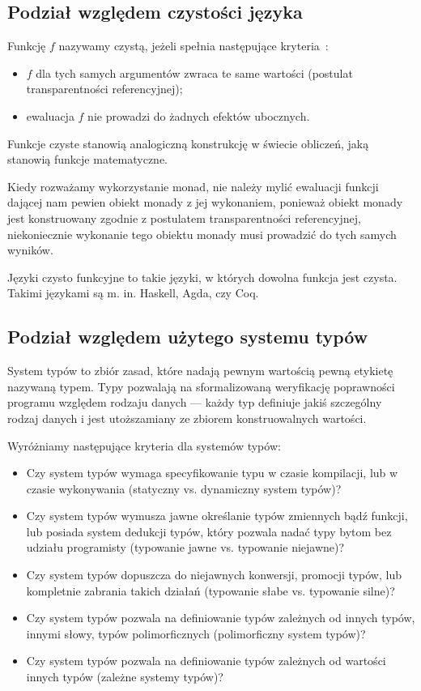 \documentclass[../praca.tex]{subfiles}
\begin{document}
\subsection{Podział względem czystości języka}

Funkcję \( f \) nazywamy czystą, jeżeli spełnia następujące kryteria~\cite{Milewski:PF}:
\begin{itemize}
  \item \( f \) dla tych samych argumentów zwraca te same wartości
    (postulat transparentności referencyjnej);
  \item ewaluacja \( f \) nie prowadzi do żadnych efektów ubocznych.
\end{itemize}

Funkcje czyste stanowią analogiczną konstrukcję w świecie obliczeń, jaką stanowią
funkcje matematyczne.

\begin{remark}
  Kiedy rozważamy wykorzystanie monad, nie należy mylić ewaluacji funkcji
  dającej nam pewien obiekt monady z jej wykonaniem, ponieważ
  obiekt monady jest konstruowany zgodnie z postulatem transparentności referencyjnej,
  niekoniecznie wykonanie tego obiektu monady musi prowadzić do tych samych wyników.
\end{remark}

Języki czysto funkcyjne to takie języki, w których dowolna funkcja jest czysta. 
Takimi językami są m. in. Haskell, Agda, czy Coq.

\subsection{Podział względem użytego systemu typów}

System typów to zbiór zasad, które nadają pewnym wartością pewną etykietę
nazywaną typem. Typy pozwalają na sformalizowaną weryfikację poprawności
programu względem rodzaju danych --- każdy typ definiuje jakiś szczególny
rodzaj danych i jest utoższamiany ze zbiorem konstruowalnych wartości.~\cite{Pierce:TPL}

Wyróżniamy następujące kryteria dla systemów typów:

\begin{itemize}
  \item Czy system typów wymaga specyfikowanie typu w czasie kompilacji,
    lub w czasie wykonywania (statyczny vs. dynamiczny system typów)?
  \item Czy system typów wymusza jawne określanie typów zmiennych
    bądź funkcji, lub posiada system dedukcji typów, który pozwala
    nadać typy bytom bez udziału programisty (typowanie jawne vs.
    typowanie niejawne)?
  \item Czy system typów dopuszcza do niejawnych konwersji, promocji
    typów, lub kompletnie zabrania takich działań (typowanie słabe
    vs. typowanie silne)?
  \item Czy system typów pozwala na definiowanie typów zależnych
    od innych typów, innymi słowy, typów polimorficznych (polimorficzny
    system typów)?
  \item Czy system typów pozwala na definiowanie typów zależnych
    od wartości innych typów (zależne systemy typów)?
\end{itemize}
\end{document}
